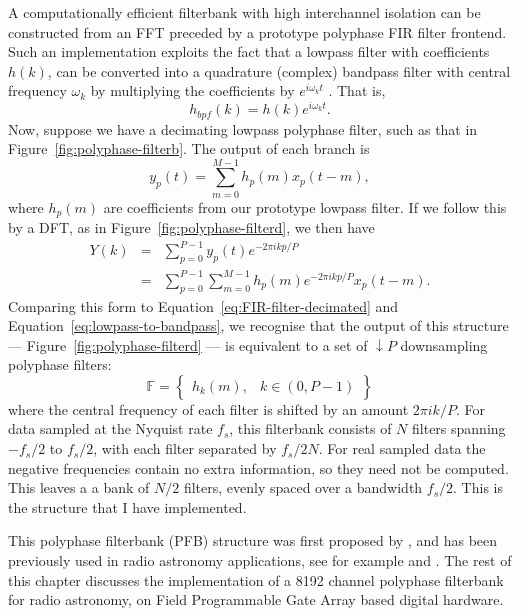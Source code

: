\documentclass{ws-rv961x669}
\begin{document}
A computationally efficient filterbank with high interchannel isolation
can be constructed from an FFT preceded by a prototype polyphase FIR
filter frontend. Such an implementation exploits the fact that a lowpass
filter with coefficients $h(k)$, can be converted into a quadrature
(complex) bandpass filter with central frequency $\omega_{k}$ by
multiplying the coefficients by $e^{i\omega_{k}t}$ . That is,
\begin{equation}
h_{bpf}(k)=h(k)e^{i\omega_{k}t}.\label{eq:lowpass-to-bandpass}
\end{equation}
Now, suppose we have a decimating lowpass polyphase filter, such as
that in Figure~\ref{fig:polyphase-filterb}. The output of each branch
is 
\begin{equation}
y_{p}(t)=\sum_{m=0}^{M-1}h_{p}(m)x_{p}(t-m),
\end{equation}
where $h_{p}(m)$ are coefficients from our prototype lowpass filter.
If we follow this by a DFT, as in Figure~\ref{fig:polyphase-filterd},
we then have 
\begin{eqnarray}
Y(k) & = & \sum_{p=0}^{P-1}y_{p}(t)e^{-2\pi ikp/P}\\
 & = & \sum_{p=0}^{P-1}\sum_{m=0}^{M-1}h_{p}(m)e^{-2\pi ikp/P}x_{p}(t-m).
\end{eqnarray}
Comparing this form to Equation~\ref{eq:FIR-filter-decimated} and
Equation~\ref{eq:lowpass-to-bandpass}, we recognise that the output
of this structure --- Figure~\ref{fig:polyphase-filterd} --- is
equivalent to a set of $\downarrow P$ downsampling polyphase filters:
\begin{equation}
\mathbb{F}=\begin{Bmatrix}h_{k}(m), & k\in(0,P-1)\end{Bmatrix}
\end{equation}
where the central frequency of each filter is shifted by an amount
$\mbox{2}\pi ik/P$. For data sampled at the Nyquist rate $f_{s}$,
this filterbank consists of $N$ filters spanning $-f_{s}/\mbox{2}$
to $f_{s}/\mbox{2}$, with each filter separated by $f_{s}/\mbox{2}N$.
For real sampled data the negative frequencies contain no extra information,
so they need not be computed. This leaves a a bank of $N/\mbox{2}$
filters, evenly spaced over a bandwidth $f_{s}/\mbox{2}$. This is
the structure that I have implemented.

This polyphase filterbank (PFB) structure was first proposed by \citet{Bellanger:1976p7898},
and has been previously used in radio astronomy applications, see
for example \citet{Zimmerman:1991p6933} and \citet{Parsons:2006p257}.
The rest of this chapter discusses the implementation of a 8192 channel
polyphase filterbank for radio astronomy, on Field Programmable Gate
Array based digital hardware.
\end{document}
